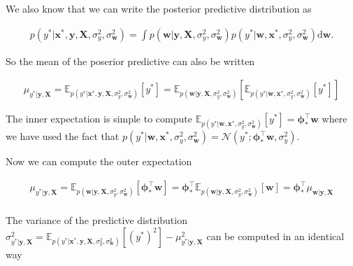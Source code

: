 \documentclass[11pt]{article}
\begin{document}
We also know that we can write the posterior predictive distribution as

\begin{align}
p(y^* | \mathbf{x}^*, \mathbf{y},\mathbf{X},\sigma_y^2,\sigma_{\mathbf{w}}^2)  = \int p( \mathbf{w} |  \mathbf{y},\mathbf{X},\sigma_y^2,\sigma_{\mathbf{w}}^2) p(y^* | \mathbf{w} , \mathbf{x}^*, \sigma_y^2,\sigma_{\mathbf{w}}^2) \mathrm{d} \mathbf{w}.
\end{align}

So the mean of the poserior predictive can also be written

\begin{align}
\mu_{y^*|\mathbf{y},\mathbf{X}} =  \mathbb{E}_{p(y^* | \mathbf{x}^*, \mathbf{y},\mathbf{X},\sigma_y^2,\sigma_{\mathbf{w}}^2)}[y^*] = \mathbb{E}_{p( \mathbf{w} |  \mathbf{y},\mathbf{X},\sigma_y^2,\sigma_{\mathbf{w}}^2)}[ \mathbb{E}_{p(y^* | \mathbf{w} , \mathbf{x}^*, \sigma_y^2,\sigma_{\mathbf{w}}^2)}  [y^*] ]
\end{align}

The inner expectation is simple to compute
\(\mathbb{E}_{p(y^* | \mathbf{w} , \mathbf{x}^*, \sigma_y^2,\sigma_{\mathbf{w}}^2)} [y^*] = \boldsymbol{\phi}_*^\top \mathbf{w}\)
where we have used the fact that
\(p(y^* | \mathbf{w} , \mathbf{x}^*, \sigma_y^2,\sigma_{\mathbf{w}}^2) = \mathcal{N}(y^*; \boldsymbol{\phi}_*^\top \mathbf{w}, \sigma_y^2)\).

Now we can compute the outer expectation

\begin{align}
\mu_{y^*|\mathbf{y},\mathbf{X}} =  \mathbb{E}_{p( \mathbf{w} |  \mathbf{y},\mathbf{X},\sigma_y^2,\sigma_{\mathbf{w}}^2)}[ \boldsymbol{\phi}_*^\top \mathbf{w} ]= \boldsymbol{\phi}_*^\top\mathbb{E}_{p( \mathbf{w} |  \mathbf{y},\mathbf{X},\sigma_y^2,\sigma_{\mathbf{w}}^2)}[\mathbf{w}] = \boldsymbol{\phi}_*^\top \mu_{\mathbf{w}| \mathbf{y},\mathbf{X}}\\
\end{align}

The variance of the predictive distribution
\(\sigma^2_{y^*| \mathbf{y},\mathbf{X}} = \mathbb{E}_{p(y^* | \mathbf{x}^*, \mathbf{y},\mathbf{X},\sigma_y^2,\sigma_{\mathbf{w}}^2)}[(y^* )^2]- \mu_{y^*|\mathbf{y},\mathbf{X}}^2\)
can be computed in an identical way
\end{document}
